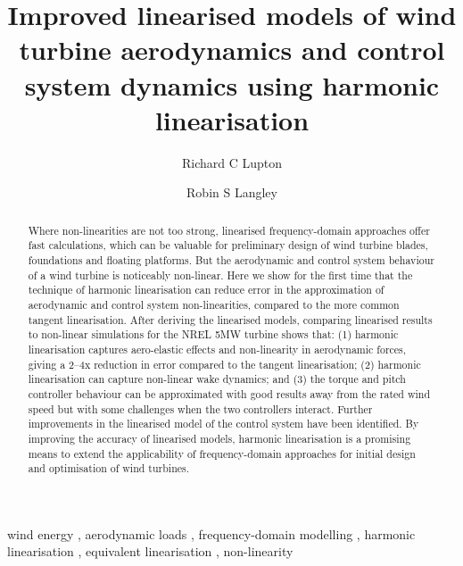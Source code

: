 \documentclass[a4paper,preprint]{elsarticle}
\begin{document}
\begin{frontmatter}
  \title{Improved linearised models of wind turbine aerodynamics and control
    system dynamics using harmonic linearisation}

  \author[cued]{Richard C Lupton} 

  \author[cued]{Robin S Langley} 


  \address[cued]{Department of Engineering, University of Cambridge, Trumpington
    St, Cambridge, CB2 1PZ, UK}

  \begin{abstract}
    Where non-linearities are not too strong, linearised frequency-domain
    approaches offer fast calculations, which can be valuable for preliminary
    design of wind turbine blades, foundations and floating platforms. But the
    aerodynamic and control system behaviour of a wind turbine is noticeably
    non-linear. Here we show for the first time that the technique of harmonic
    linearisation can reduce error in the approximation of aerodynamic and
    control system non-linearities, compared to the more common tangent
    linearisation. After deriving the linearised models, comparing linearised
    results to non-linear simulations for the NREL 5MW turbine shows that: (1)
    harmonic linearisation captures aero-elastic effects and non-linearity in
    aerodynamic forces, giving a 2--4x reduction in error compared to the
    tangent linearisation; (2) harmonic linearisation can capture non-linear
    wake dynamics; and (3) the torque and pitch controller behaviour can be
    approximated with good results away from the rated wind speed but with some
    challenges when the two controllers interact. Further improvements in the
    linearised model of the control system have been identified. By improving
    the accuracy of linearised models, harmonic linearisation is a promising
    means to extend the applicability of frequency-domain approaches for initial
    design and optimisation of wind turbines.
  \end{abstract}

\begin{keyword}
  wind energy \sep
  aerodynamic loads \sep
  frequency-domain modelling \sep
  harmonic linearisation \sep
  equivalent linearisation \sep
  non-linearity
\end{keyword}
\end{frontmatter}
\end{document}
